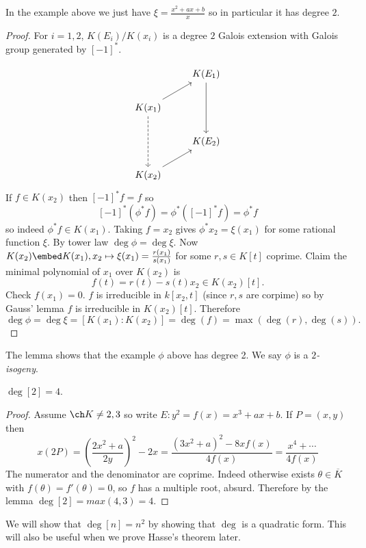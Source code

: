 \documentclass[a4paper]{article}
\theoremstyle{definition}
\begin{document}
\begin{eg}
  In the example above we just have \(\xi = \frac{x^2 + ax + b}{x}\) so in particular it has degree \(2\).
\end{eg}

\begin{proof}
  For \(i = 1, 2\), \(K(E_i)/K(x_i)\) is a degree \(2\) Galois extension with Galois group generated by \([-1]^*\).

  \[
    \begin{tikzcd}
      & K(E_1) \ar[dd] \\
      K(x_1) \ar[ur] \ar[dd, dashed] \\
      & K(E_2) \\
      K(x_2) \ar[ur]
    \end{tikzcd}
  \]
  If \(f \in K(x_2)\) then \([-1]^* f = f\) so
  \[
    [-1]^*(\phi^* f) = \phi^*([-1]^* f) = \phi^* f
  \]
  so indeed \(\phi^*f \in K(x_1)\). Taking \(f = x_2\) gives \(\phi^*x_2 = \xi(x_1)\) for some rational function \(\xi\). By tower law \(\deg \phi = \deg \xi\). Now \(K(x_2) \embed K(x_1), x_2 \mapsto \xi(x_1) = \frac{r(x_1)}{s(x_1)}\) for some \(r, s \in K[t]\) coprime. Claim the minimal polynomial of \(x_1\) over \(K(x_2)\) is
  \[
    f(t) = r(t) - s(t)x_2 \in K(x_2)[t].
  \]
  Check \(f(x_1) = 0\). \(f\) is irreducible in \(k[x_2, t]\) (since \(r, s\) are corpime) so by Gauss' lemma \(f\) is irreducible in \(K(x_2)[t]\). Therefore
  \[
    \deg \phi = \deg \xi = [K(x_1): K(x_2)] = \deg(f) = \max(\deg(r), \deg(s)).
  \]
\end{proof}

The lemma shows that the example \(\phi\) above has degree 2. We say \(\phi\) is a \emph{\(2\)-isogeny}.

\begin{lemma}
  \(\deg [2] = 4\).
\end{lemma}

\begin{proof}
  Assume \(\ch K \neq 2, 3\) so write \(E: y^2 = f(x) = x^3 + ax + b\). If \(P = (x, y)\) then
  \[
    x(2P)
    = \left( \frac{2x^2 + a}{2y} \right)^2 - 2x
    = \frac{(3x^2 + a)^2 - 8x f(x)}{4 f(x)} 
    = \frac{x^4 + \cdots}{4 f(x)}
  \]
  The numerator and the denominator are coprime. Indeed otherwise exists \(\theta \in \overline K\) with \(f(\theta) = f'(\theta) = 0\), so \(f\) has a multiple root, absurd. Therefore by the lemma \(\deg [2] = max(4, 3) = 4\).
\end{proof}

We will show that \(\deg [n] = n^2\) by showing that \(\deg\) is a quadratic form. This will also be useful when we prove Hasse's theorem later.
\end{document}
